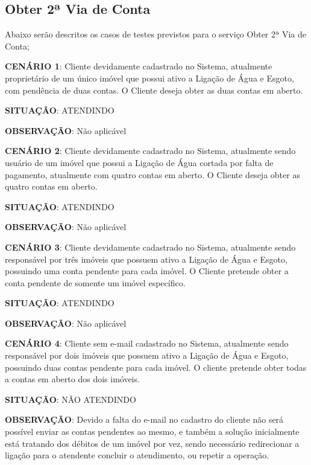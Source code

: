\subsection{Obter 2ª Via de Conta}
Abaixo serão descritos os casos de testes previstos para o serviço Obter 2ª Via de Conta;
\begin{flushleft}
	\begin{description}
		\item \textbf{CENÁRIO 1}: Cliente devidamente cadastrado no Sistema, atualmente proprietário de um único imóvel que possui ativo a Ligação de Água e Esgoto, com pendência de duas contas. O Cliente deseja obter as duas contas em aberto.
		\item \textbf{SITUAÇÃO}: ATENDINDO
		\item \textbf{OBSERVAÇÃO}: Não aplicável
	\end{description}
	
	\begin{description}
		\item \textbf{CENÁRIO 2}: Cliente devidamente cadastrado no Sistema, atualmente sendo usuário de um imóvel que possui a Ligação de Água cortada por falta de pagamento, atualmente com quatro contas em aberto. O Cliente deseja obter as quatro contas em aberto.
		\item \textbf{SITUAÇÃO}: ATENDINDO
		\item \textbf{OBSERVAÇÃO}: Não aplicável
	\end{description}
	
	\begin{description}
		\item \textbf{CENÁRIO 3}: Cliente devidamente cadastrado no Sistema, atualmente sendo responsável por três imóveis que possuem ativo a Ligação de Água e Esgoto, possuindo uma conta pendente para cada imóvel. O Cliente pretende obter a conta pendente de somente um imóvel específico. 
		\item \textbf{SITUAÇÃO}: ATENDINDO
		\item \textbf{OBSERVAÇÃO}: Não aplicável
	\end{description}
	
	\begin{description}
		\item \textbf{CENÁRIO 4}: Cliente sem e-mail cadastrado no Sistema, atualmente sendo responsável por dois imóveis que possuem ativo a Ligação de Água e Esgoto, possuindo duas contas pendente para cada imóvel.  O cliente pretende obter todas a contas em aberto dos dois imóveis. 
		\item \textbf{SITUAÇÃO}: NÃO ATENDINDO
		\item \textbf{OBSERVAÇÃO}: Devido a falta do e-mail no cadastro do cliente não será possível enviar as contas pendentes ao mesmo, e também a solução inicialmente está tratando dos débitos de um imóvel por vez, sendo necessário redirecionar a ligação para o atendente concluir o atendimento, ou repetir a operação.
	\end{description}
\end{flushleft}


